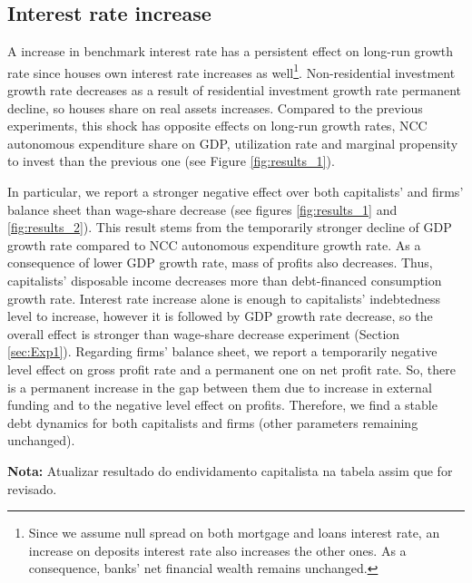 \documentclass[11pt]{article}
\begin{document}
\subsection{Interest rate increase}
\label{sec:orgdb5fff5}
\label{sec:Exp3}

A increase in benchmark interest rate  has a persistent effect on long-run growth rate since houses own interest rate increases as well\footnote{Since we assume null spread on both mortgage and loans interest rate, an increase on deposits interest rate also increases the other ones. As a consequence, banks' net financial wealth remains unchanged.}.
Non-residential investment growth rate decreases as a result of residential investment growth rate permanent decline, so houses share on real assets increases.
Compared to the previous experiments, this shock has opposite effects on long-run growth rates, NCC autonomous expenditure share on GDP, utilization rate and marginal propensity to invest  than the previous one (see Figure \ref{fig:results_1}).


In particular, we report a stronger negative effect over both capitalists' and firms' balance sheet than wage-share decrease (see figures \ref{fig:results_1} and \ref{fig:results_2}).
This result stems from the temporarily stronger decline of GDP growth rate compared to NCC autonomous expenditure growth rate.
As a consequence of lower GDP growth rate, mass of profits also decreases.
Thus, capitalists' disposable income decreases more than debt-financed consumption growth rate.
Interest rate increase alone is enough to capitalists' indebtedness level to increase, however it is followed by GDP growth rate decrease, so the overall effect is stronger than wage-share decrease experiment (Section \ref{sec:Exp1}).
Regarding firms' balance sheet, we report a temporarily negative level effect on gross profit rate and a permanent one on net profit rate. 
So, there is a permanent increase in the gap between them due to increase in external funding and to the negative level effect on profits.
Therefore, we find a stable debt dynamics for both capitalists and firms (other parameters remaining unchanged).

\textbf{Nota:} Atualizar resultado do endividamento capitalista na tabela assim que for revisado.
\end{document}
